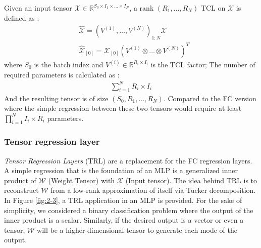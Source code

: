 \documentclass{article}
\begin{document}
Given an input tensor $\mathcal{X} \in \mathbb{R}^{S_0\times I_1\times\dots\times I_N}$, a rank $(R_1,\dots,R_N)$ TCL on $\mathcal{X}$  is defined as :
\begin{align}
	\label{eq:tcl}
	&\hat{\mathcal{X}} = \left(V^{(1)},\dots,V^{(N)}\right)_{1:N} \mathcal{X}
	\nonumber\\
	&\hat{\mathcal{X}}_{[0]} = \mathcal{X}_{[0]} (V^{(1)}\otimes\dots\otimes V^{(N)})^T
\end{align}
where $S_0$ is the batch index and $V^{(i)} \in \mathbb{R}^{R_i\times I_i}$ is the TCL factor; The number of required parameters is calculated as :
\begin{align}
	\label{eq:tcl-parmeter}
	\sum_{i=1}^{N}R_i\times I_i
\end{align}
And the resulting tensor is of size $(S_0,R_1,\dots,R_N)$.
Compared to the FC version where the simple regression between these two tensors would require at least $\prod_{i=1}^{N}I_i\times R_i$ parameters.
\subsubsection{Tensor regression layer}
\label{subsubsec:trl}
\textit{Tensor Regression Layers} (TRL) \cite{r1} are a replacement for the FC regression layers. A simple regression that is the foundation of an MLP is a generalized inner product of $\mathcal{W}$ (Weight Tensor) with $\mathcal{X}$ (Input tensor). The idea behind TRL is to reconstruct $\mathcal{W}$ from a low-rank approximation of itself via Tucker decomposition. In Figure \ref{fig:2-3}, a TRL application in an MLP is provided. For the sake of simplicity, we considered a binary classification problem where the output of the inner product is a scalar. Similarly, if the desired output is a vector or even a tensor, $\mathcal{W}$ will be a higher-dimensional tensor to generate each mode of the output.
\end{document}

